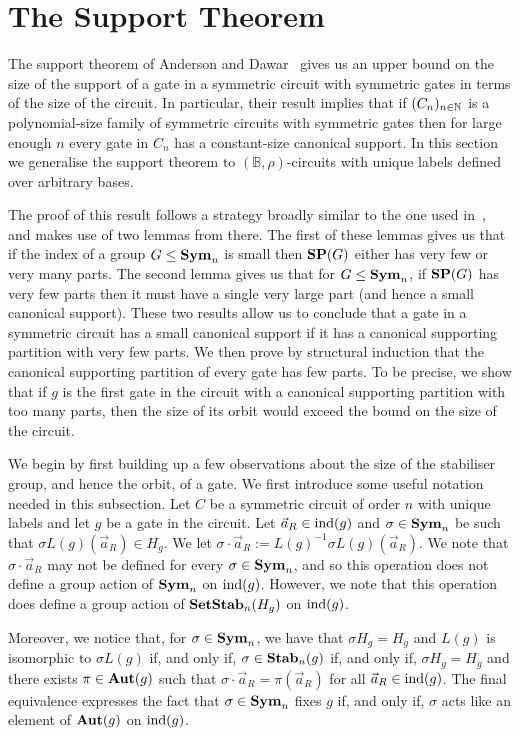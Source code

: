 \documentclass[../main/thesis.tex]{subfiles}
\begin{document}
\section{The Support Theorem}
The support theorem of Anderson and Dawar~\cite{AndersonD17} gives us an upper
bound on the size of the support of a gate in a symmetric circuit with symmetric
gates in terms of the size of the circuit. In particular, their result implies
that if $(C_n)_{n \in \mathbb{N}}$ is a polynomial-size family of symmetric circuits
with symmetric gates then for large enough $n$ every gate in $C_n$ has a
constant-size canonical support. In this section we generalise the support
theorem to $(\mathbb{B}, \rho)$-circuits with unique labels defined over
arbitrary bases.

The proof of this result follows a strategy broadly similar to the one used
in~\cite{AndersonD17}, and makes use of two lemmas from there. The first of
these lemmas gives us that if the index of a group $G \leq \text{\textbf{Sym}}_n$ is small then
$\text{\textbf{SP}}(G)$ either has very few or very many parts. The second lemma gives us that
for $G \leq \text{\textbf{Sym}}_n$, if $\text{\textbf{SP}}(G)$ has very few parts then it must have a single
very large part (and hence a small canonical support). These two results allow
us to conclude that a gate in a symmetric circuit has a small canonical support
if it has a canonical supporting partition with very few parts. We then prove by
structural induction that the canonical supporting partition of every gate has
few parts. To be precise, we show that if $g$ is the first gate in the circuit
with a canonical supporting partition with too many parts, then the size of its
orbit would exceed the bound on the size of the circuit.

We begin by first building up a few observations about the size of the
stabiliser group, and hence the orbit, of a gate. We first introduce some useful
notation needed in this subsection. Let $C$ be a symmetric circuit of order $n$
with unique labels and let $g$ be a gate in the circuit. Let $\vec{a}_R \in
\text{\upshape ind}(g)$ and $\sigma \in \text{\textbf{Sym}}_n$ be such that $\sigma L(g)(\vec{a}_R) \in H_g$.
We let $\sigma \cdot \vec{a}_R := L(g)^{-1}\sigma L(g)(\vec{a}_R)$. We note that
$\sigma \cdot \vec{a}_R$ may not be defined for every $\sigma \in \text{\textbf{Sym}}_n$, and
so this operation does not define a group action of $\text{\textbf{Sym}}_n$ on $\text{\upshape ind}(g)$.
However, we note that this operation does define a group action of
$\text{\textbf{SetStab}}_n(H_g)$ on $\text{\upshape ind}(g)$.

Moreover, we notice that, for $\sigma \in \text{\textbf{Sym}}_n$, we have that $\sigma H_g =
H_g$ and $L(g)$ is isomorphic to $\sigma L(g)$ if, and only if, $\sigma \in
\text{\textbf{Stab}}_n(g)$ if, and only if, $\sigma H_g = H_g$ and there exists $\pi \in
\text{\textbf{Aut}}(g)$ such that $\sigma \cdot \vec{a}_R = \pi (\vec{a}_R)$ for all $\vec{a}_R
\in \text{\upshape ind}(g)$. The final equivalence expresses the fact that $\sigma \in \text{\textbf{Sym}}_n$
fixes $g$ if, and only if, $\sigma$ acts like an element of $\text{\textbf{Aut}}(g)$ on
$\text{\upshape ind}(g)$.
\end{document}
